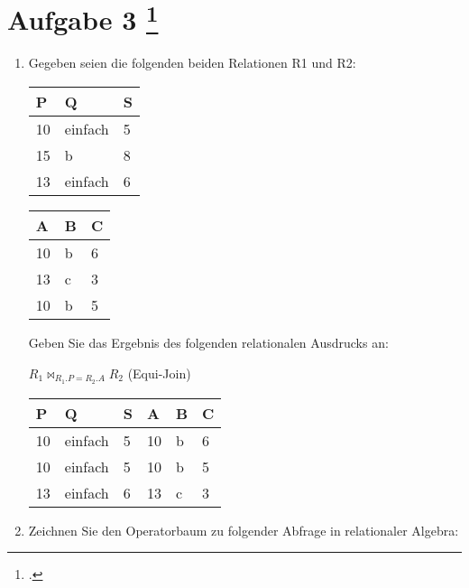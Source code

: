 \documentclass{lehramt-informatik-aufgabe}
\begin{document}
\liAufgabenTitel{}
\section{Aufgabe 3
\footcite{examen:66116:2021:03}}

\begin{enumerate}


\item Gegeben seien die folgenden beiden Relationen R1 und R2:


\begin{tabular}{|l|l|l|}
\hline
P  & Q       & S \\ \hline
10 & einfach & 5 \\ \hline
15 & b       & 8 \\ \hline
13 & einfach & 6 \\ \hline
\end{tabular}


\begin{tabular}{|l|l|l|}
\hline
A  & B & C \\ \hline
10 & b & 6 \\ \hline
13 & c & 3 \\ \hline
10 & b & 5 \\ \hline
\end{tabular}

Geben Sie das Ergebnis des folgenden relationalen Ausdrucks an:

\begin{center}
$R_1 \bowtie_ {R_1.P = R_2.A} R_2$ (Equi-Join)
\end{center}

\begin{liAntwort}
\begin{tabular}{|l|l|l|l|l|l|}
\hline
P  & Q       & S & A  & B & C \\ \hline
10 & einfach & 5 & 10 & b & 6 \\ \hline
10 & einfach & 5 & 10 & b & 5 \\ \hline
13 & einfach & 6 & 13 & c & 3 \\ \hline
\end{tabular}
\end{liAntwort}


\item Zeichnen Sie den Operatorbaum zu folgender Abfrage in relationaler Algebra:


\end{enumerate}
\end{document}
